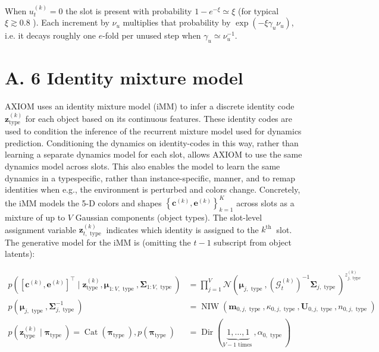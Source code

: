 \documentclass[10pt]{article}
\begin{document}
When $u_{t}^{(k)}=0$ the slot is present with probability $1-e^{-\xi} \simeq \xi$ (for typical $\xi \gtrsim 0.8$ ). Each increment by $\nu_{u}$ multiplies that probability by $\exp \left(-\xi \gamma_{u} \nu_{u}\right)$, i.e. it decays roughly one $e$-fold per unused step when $\gamma_{u} \simeq \nu_{u}^{-1}$.

\section*{A. 6 Identity mixture model}
AXIOM uses an identity mixture model (iMM) to infer a discrete identity code $\mathbf{z}_{\text {type }}^{(k)}$ for each object based on its continuous features. These identity codes are used to condition the inference of the recurrent mixture model used for dynamics prediction. Conditioning the dynamics on identity-codes in this way, rather than learning a separate dynamics model for each slot, allows AXIOM to use the same dynamics model across slots. This also enables the model to learn the same dynamics in a typespecific, rather than instance-specific, manner, and to remap identities when e.g., the environment is perturbed and colors change. Concretely, the iMM models the 5-D colors and shapes $\left\{\mathbf{c}^{(k)}, \mathbf{e}^{(k)}\right\}_{k=1}^{K}$ across slots as a mixture of up to $V$ Gaussian components (object types). The slot-level assignment variable $\mathbf{z}_{t, \text { type }}^{(k)}$ indicates which identity is assigned to the $k^{\text {th }}$ slot. The generative model for the iMM is (omitting the $t-1$ subscript from object latents):


\begin{align*}
p\left(\left[\mathbf{c}^{(k)}, \mathbf{e}^{(k)}\right]^{\top} \mid \mathbf{z}_{\text {type }}^{(k)}, \boldsymbol{\mu}_{1: V, \text { type }}, \boldsymbol{\Sigma}_{1: V, \text { type }}\right) & =\prod_{j=1}^{V} \mathcal{N}\left(\boldsymbol{\mu}_{j, \text { type }},\left(\mathcal{G}_{t}^{(k)}\right)^{-1} \boldsymbol{\Sigma}_{j, \text { type }}\right)^{z_{j, \text { type }}^{(k)}}  \tag{23}\\
p\left(\boldsymbol{\mu}_{j, \text { type }}, \boldsymbol{\Sigma}_{j, \text { type }}^{-1}\right) & =\operatorname{NIW}\left(\mathbf{m}_{0, j, \text { type }}, \kappa_{0, j, \text { type }}, \mathbf{U}_{0, j, \text { type }}, n_{0, j, \text { type }}\right)  \tag{24}\\
p\left(\mathbf{z}_{\text {type }}^{(k)} \mid \boldsymbol{\pi}_{\text {type }}\right)=\operatorname{Cat}\left(\boldsymbol{\pi}_{\text {type }}\right), p\left(\boldsymbol{\pi}_{\text {type }}\right) & =\operatorname{Dir}(\underbrace{1, \ldots, 1}_{V-1 \text { times }}, \alpha_{0, \text { type }}) \tag{25}
\end{align*}
\end{document}
